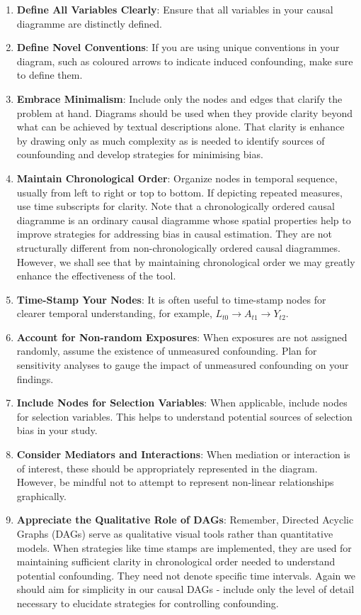 \documentclass[
  singlecolumn]{report}
\begin{document}
\begin{enumerate}
\def\labelenumi{\arabic{enumi}.}
\item
  \textbf{Define All Variables Clearly}: Ensure that all variables in
  your causal diagramme are distinctly defined.
\item
  \textbf{Define Novel Conventions}: If you are using unique conventions
  in your diagram, such as coloured arrows to indicate induced
  confounding, make sure to define them.
\item
  \textbf{Embrace Minimalism}: Include only the nodes and edges that
  clarify the problem at hand. Diagrams should be used when they provide
  clarity beyond what can be achieved by textual descriptions alone.
  That clarity is enhance by drawing only as much complexity as is
  needed to identify sources of counfounding and develop strategies for
  minimising bias.
\item
  \textbf{Maintain Chronological Order}: Organize nodes in temporal
  sequence, usually from left to right or top to bottom. If depicting
  repeated measures, use time subscripts for clarity. Note that a
  chronologically ordered causal diagramme is an ordinary causal
  diagramme whose spatial properties help to improve strategies for
  addressing bias in causal estimation. They are not structurally
  different from non-chronologically ordered causal diagrammes. However,
  we shall see that by maintaining chronological order we may greatly
  enhance the effectiveness of the tool.
\item
  \textbf{Time-Stamp Your Nodes}: It is often useful to time-stamp nodes
  for clearer temporal understanding, for example,
  \(L_{t0} \rightarrow A_{t1} \rightarrow Y_{t2}\).
\item
  \textbf{Account for Non-random Exposures}: When exposures are not
  assigned randomly, assume the existence of unmeasured confounding.
  Plan for sensitivity analyses to gauge the impact of unmeasured
  confounding on your findings.
\item
  \textbf{Include Nodes for Selection Variables}: When applicable,
  include nodes for selection variables. This helps to understand
  potential sources of selection bias in your study.
\item
  \textbf{Consider Mediators and Interactions}: When mediation or
  interaction is of interest, these should be appropriately represented
  in the diagram. However, be mindful not to attempt to represent
  non-linear relationships graphically.
\item
  \textbf{Appreciate the Qualitative Role of DAGs}: Remember, Directed
  Acyclic Graphs (DAGs) serve as qualitative visual tools rather than
  quantitative models. When strategies like time stamps are implemented,
  they are used for maintaining sufficient clarity in chronological
  order needed to understand potential confounding. They need not denote
  specific time intervals. Again we should aim for simplicity in our
  causal DAGs - include only the level of detail necessary to elucidate
  strategies for controlling confounding.
\end{enumerate}
\end{document}
